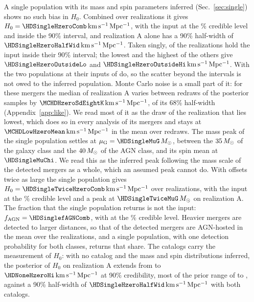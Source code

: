 \documentclass[aps,prd,reprint,twocolumn,superscriptaddress,nofootinbib,floatfix,nolongbibliography]{revtex4-2}
\newcommand{\msun}{\,M_\odot}
\newcommand{\kms}{{\rm km\,s^{-1}\,Mpc^{-1}}}
\newcommand{\fagn}{f_{\rm AGN}}
\begin{document}
A single population with its mass and spin parameters inferred
(Sec.~\ref{sec:single}) shows no such bias in $H_0$.
Combined over \NrealHDSingle{} realizations it gives
$H_0=\HDSingleHzeroComb\,\kms$, with the input at the \HDSingleHzeroCL\%
credible level and inside the 90\% interval, and realization A alone has a
90\% half-width of $\HDSingleHzeroHalfWid\,\kms$.
Taken singly, \HDSingleHzeroInside{} of the \NrealHDSingle{} realizations
hold the input inside their 90\% interval; the lowest and the highest of the
others give $\HDSingleHzeroOutsideLo$ and $\HDSingleHzeroOutsideHi\,\kms$.
With the two populations at their inputs \HDPopsHzeroInside{} of
\NrealHDAssumed{} do, so the scatter beyond the intervals is not owed to the
inferred population. Monte Carlo noise is a small part of it: for these
mergers the median of realization A varies between redraws of the posterior
samples by $\MCHDHzeroSdEightK\,\kms$, \MCHDHzeroSdRelEightK{} of its 68\%
half-width (Appendix~\ref{app:like}). We read most of it as the draw of the
realization that lies lowest, which does so in every analysis of its
mergers and stays at $\MCHDLowHzeroMean\,\kms$ in the mean over
\MCHDNdraws{} redraws.
The mass peak of the single population settles at
$\mu_{\rm G}=\HDSingleMuG\msun$, between the
$\MockMuG\msun$ of the galaxy class and the $\MockMuGAGN\msun$ of the AGN
class, and its spin mean at $\HDSingleMuChi$. We read this as the inferred
peak following the mass scale of the detected mergers as a whole, which an
assumed peak cannot do. With offsets twice as large the
single population gives $H_0=\HDSingleTwiceHzeroComb\,\kms$ over
\NrealHDSingleTwice{} realizations, with the input at the
\HDSingleTwiceHzeroCL\% credible level and a peak at
$\HDSingleTwiceMuG\msun$ on realization A.
The fraction that the single population returns is not the input:
$\fagn=\HDSinglefAGNComb$, with \MockfAGN{} at the \HDSinglefAGNCL\% credible
level. Heavier mergers are detected to larger distances, so that
\MockHDfDetMean{} of the detected mergers are AGN-hosted in the mean over
the realizations, and a single population, with one detection probability
for both classes, returns that share.
The catalogs carry the measurement of $H_0$: with no catalog and the mass
and spin distributions inferred, the posterior of $H_0$ on realization A
extends from \HDNoneHzeroLo{} to $\HDNoneHzeroHi\,\kms$ at 90\% credibility,
most of the prior range of \PriorHzeroLo{} to \PriorHzeroHi, against a 90\%
half-width of $\HDSingleHzeroHalfWid\,\kms$ with both catalogs.
\end{document}
